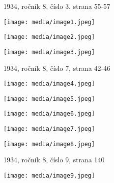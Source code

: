 1934, ročník 8, číslo 3, strana 55-57

\texttt{[image: media/image1.jpeg]}

\texttt{[image: media/image2.jpeg]}

\texttt{[image: media/image3.jpeg]}

1934, ročník 8, číslo 7, strana 42-46

\texttt{[image: media/image4.jpeg]}

\texttt{[image: media/image5.jpeg]}

\texttt{[image: media/image6.jpeg]}

\texttt{[image: media/image7.jpeg]}

\texttt{[image: media/image8.jpeg]}

1934, ročník 8, číslo 9, strana 140

\texttt{[image: media/image9.jpeg]}
